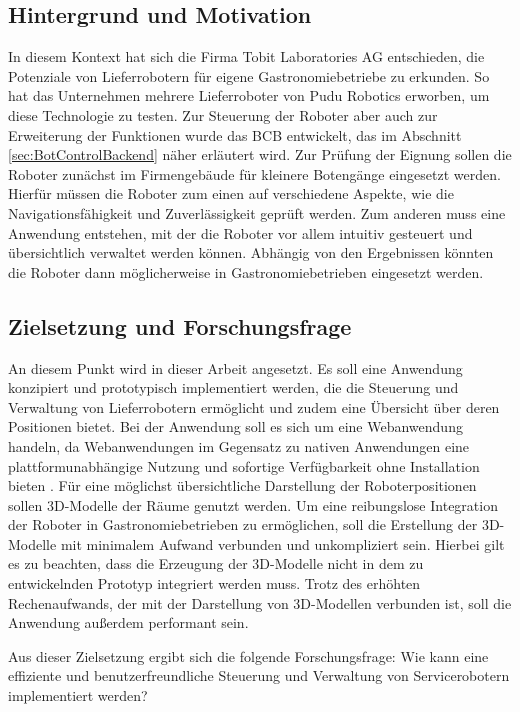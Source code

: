 \subsection{Hintergrund und Motivation}\label{sec:BackgroundAndMotivation}
In diesem Kontext hat sich die Firma Tobit Laboratories AG entschieden, die Potenziale von Lieferrobotern für eigene Gastronomiebetriebe zu erkunden. So hat das Unternehmen mehrere Lieferroboter von Pudu Robotics erworben, um diese Technologie zu testen. Zur Steuerung der Roboter aber auch zur Erweiterung der Funktionen wurde das \ac{BCB} entwickelt, das im Abschnitt \ref{sec:BotControlBackend} näher erläutert wird. Zur Prüfung der Eignung sollen die Roboter zunächst im Firmengebäude für kleinere Botengänge eingesetzt werden. Hierfür müssen die Roboter zum einen auf verschiedene Aspekte, wie die Navigationsfähigkeit und Zuverlässigkeit geprüft werden. Zum anderen muss eine Anwendung entstehen, mit der die Roboter vor allem intuitiv gesteuert und übersichtlich verwaltet werden können. Abhängig von den Ergebnissen könnten die Roboter dann möglicherweise in Gastronomiebetrieben eingesetzt werden.

\subsection{Zielsetzung und Forschungsfrage}\label{sec:ResearchQuestion}
An diesem Punkt wird in dieser Arbeit angesetzt. Es soll eine Anwendung konzipiert und prototypisch implementiert werden, die die Steuerung und Verwaltung von Lieferrobotern ermöglicht und zudem eine Übersicht über deren Positionen bietet. Bei der Anwendung soll es sich um eine Webanwendung handeln, da Webanwendungen im Gegensatz zu nativen Anwendungen eine plattformunabhängige Nutzung und sofortige Verfügbarkeit ohne Installation bieten \cite[Abschnitt~2]{AWSWebApp}. Für eine möglichst übersichtliche Darstellung der Roboterpositionen sollen 3D-Modelle der Räume genutzt werden. Um eine reibungslose Integration der Roboter in Gastronomiebetrieben zu ermöglichen, soll die Erstellung der 3D-Modelle mit minimalem Aufwand verbunden und unkompliziert sein. Hierbei gilt es zu beachten, dass die Erzeugung der 3D-Modelle nicht in dem zu entwickelnden Prototyp integriert werden muss. Trotz des erhöhten Rechenaufwands, der mit der Darstellung von 3D-Modellen verbunden ist, soll die Anwendung außerdem performant sein.

Aus dieser Zielsetzung ergibt sich die folgende Forschungsfrage: Wie kann eine effiziente und benutzerfreundliche Steuerung und Verwaltung von Servicerobotern implementiert werden?

